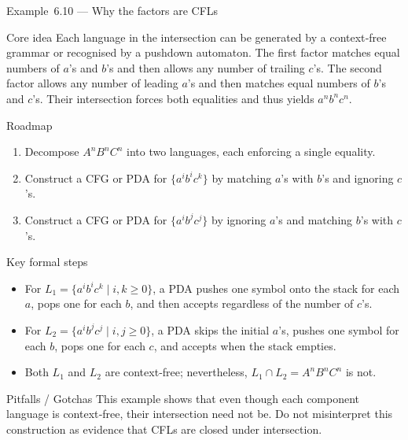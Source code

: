 \begin{frame}[t]{Example 6.10 — Why the factors are CFLs}
  \begin{tblock}{Core idea}
    Each language in the intersection can be generated by a context‑free
    grammar or recognised by a pushdown automaton.  The first factor
    matches equal numbers of $a$’s and $b$’s and then allows any number
    of trailing $c$’s.  The second factor allows any number of leading
    $a$’s and then matches equal numbers of $b$’s and $c$’s.  Their
    intersection forces both equalities and thus yields $a^n b^n c^n$.
  \end{tblock}
  \begin{tblock}{Roadmap}
    \begin{enumerate}
      \item Decompose $A^n B^n C^n$ into two languages, each enforcing
        a single equality.
      \item Construct a CFG or PDA for $\{a^i b^i c^k\}$ by matching
        $a$’s with $b$’s and ignoring $c$’s.
      \item Construct a CFG or PDA for $\{a^i b^j c^j\}$ by ignoring
        $a$’s and matching $b$’s with $c$’s.
    \end{enumerate}
  \end{tblock}
  \begin{tblock}{Key formal steps}
    \begin{itemize}
      \item For $L_1 = \{a^i b^i c^k \mid i,k\ge 0\}$, a PDA pushes one
        symbol onto the stack for each $a$, pops one for each $b$, and
        then accepts regardless of the number of $c$’s.
      \item For $L_2 = \{a^i b^j c^j \mid i,j\ge 0\}$, a PDA skips the
        initial $a$’s, pushes one symbol for each $b$, pops one for
        each $c$, and accepts when the stack empties.
      \item Both $L_1$ and $L_2$ are context‑free; nevertheless,
        $L_1 \cap L_2 = A^n B^n C^n$ is not.
    \end{itemize}
  \end{tblock}
  \begin{talert}{Pitfalls / Gotchas}
    This example shows that even though each component language is
    context‑free, their intersection need not be.  Do not misinterpret
    this construction as evidence that CFLs are closed under
    intersection.
  \end{talert}
  \label{fr:6.2-03}
\end{frame}


